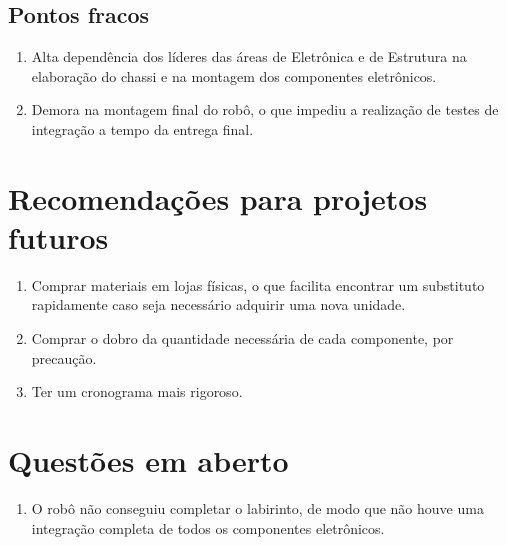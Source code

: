 \subsection{Pontos fracos}
\begin{enumerate}
	\item Alta dependência dos líderes das áreas de Eletrônica e de Estrutura na elaboração do chassi e na montagem dos componentes eletrônicos.
	\item Demora na montagem final do robô, o que impediu a realização de testes de integração a tempo da entrega final.
\end{enumerate}

\section{Recomendações para projetos futuros}

\begin{enumerate}
	\item Comprar materiais em lojas físicas, o que facilita encontrar um substituto rapidamente caso seja necessário adquirir uma nova unidade.
	\item Comprar o dobro da quantidade necessária de cada componente, por precaução.
	\item Ter um cronograma mais rigoroso.
\end{enumerate}

\section{Questões em aberto}


\begin{enumerate}
	\item O robô não conseguiu completar o labirinto, de modo que não houve uma integração completa de todos os componentes eletrônicos.
\end{enumerate}

